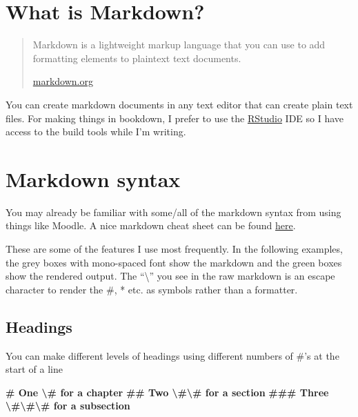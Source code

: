 \documentclass[
]{book}
\newenvironment{Shaded}{\begin{snugshade}}{\end{snugshade}}
\newcommand{\FunctionTok}[1]{\textcolor[rgb]{0.13,0.29,0.53}{\textbf{#1}}}
\begin{document}
\section{What is Markdown?}\label{sec:what-is-markdown}

\begin{quote}
Markdown is a lightweight markup language that you can use to add formatting elements to plaintext text documents.

\href{https://www.markdownguide.org/getting-started/}{markdown.org}
\end{quote}

You can create markdown documents in any text editor that can create plain text files. For making things in bookdown, I prefer to use the \href{https://www.rstudio.com/,}{RStudio} IDE so I have access to the build tools while I'm writing.

\section{Markdown syntax}\label{sec:markdown-syntax}

You may already be familiar with some/all of the markdown syntax from using things like Moodle. A nice markdown cheat sheet can be found \href{https://en.support.wordpress.com/markdown-quick-reference/,}{here}.

These are some of the features I use most frequently. In the following examples, the grey boxes with mono-spaced font show the markdown and the green boxes show the rendered output. The ``\textbackslash{}'' you see in the raw markdown is an escape character to render the \#, * etc. as symbols rather than a formatter.

\subsection{Headings}\label{sec:heading-syntax}

You can make different levels of headings using different numbers of \#'s at the start of a line

\begin{Shaded}
\begin{Highlighting}[]
\FunctionTok{\# One \textbackslash{}\#  for a chapter }
\FunctionTok{\#\# Two \textbackslash{}\#\textbackslash{}\# for a section }
\FunctionTok{\#\#\# Three \textbackslash{}\#\textbackslash{}\#\textbackslash{}\# for a subsection}
\end{Highlighting}
\end{Shaded}
\end{document}
